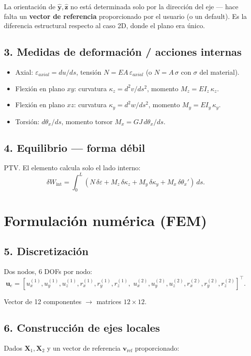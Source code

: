 \documentclass[11pt,letterpaper,oneside]{report}
\begin{document}
La orientación de $\hat{\mathbf y}, \hat{\mathbf z}$ no está determinada solo por la dirección del eje --- hace falta un \textbf{vector de referencia} proporcionado por el usuario (o un default). Es la diferencia estructural respecto al caso 2D, donde el plano era único.

\subsection{3. Medidas de deformación / acciones internas}
\begin{itemize}
  \item Axial: $\varepsilon_{axial} = du/ds$, tensión $N = EA\,\varepsilon_{axial}$ (o $N = A\,\sigma$ con $\sigma$ del material).
  \item Flexión en plano $xy$: curvatura $\kappa_z = d^2v/ds^2$, momento $M_z = EI_z\,\kappa_z$.
  \item Flexión en plano $xz$: curvatura $\kappa_y = d^2w/ds^2$, momento $M_y = EI_y\,\kappa_y$.
  \item Torsión: $d\theta_x/ds$, momento torsor $M_x = GJ\,d\theta_x/ds$.
\end{itemize}

\subsection{4. Equilibrio --- forma débil}
PTV. El elemento calcula solo el lado interno:
\[
\delta W_{\text{int}} = \int_0^L \!\left(N\,\delta\varepsilon + M_z\,\delta\kappa_z + M_y\,\delta\kappa_y + M_x\,\delta\theta_x'\right)\,ds.
\]


\section{Formulación numérica (FEM)}

\subsection{5. Discretización}
Dos nodos, 6 DOFs por nodo:
\[
\mathbf u_e = [u_x^{(1)}, u_y^{(1)}, u_z^{(1)}, r_x^{(1)}, r_y^{(1)}, r_z^{(1)},\; u_x^{(2)}, u_y^{(2)}, u_z^{(2)}, r_x^{(2)}, r_y^{(2)}, r_z^{(2)}]^\top.
\]

Vector de 12 componentes \ensuremath{\to} matrices $12\times 12$.

\subsection{6. Construcción de ejes locales}
Dados $\mathbf X_1, \mathbf X_2$ y un vector de referencia $\mathbf v_{\text{ref}}$ proporcionado:
\end{document}
